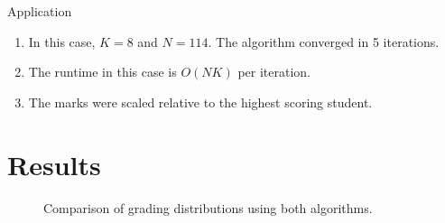 \documentclass{beamer}
\providecommand{\brak}[1]{\ensuremath{\left(#1\right)}}
\theoremstyle{remark}
\begin{document}
\begin{frame}{Application}
    \begin{enumerate}
        \item In this case, $K = 8$ and $N = 114$. The algorithm converged in 5 iterations.
        \item The runtime in this case is $O\brak{NK}$ per iteration.
        \item The marks were scaled relative to the highest scoring student.
    \end{enumerate}
\end{frame}

\section{Results}
\begin{frame}
    \begin{figure}
        \centering
        \qquad
        \caption{Comparison of grading distributions using both algorithms.}
    \end{figure}
\end{frame}
\end{document}
